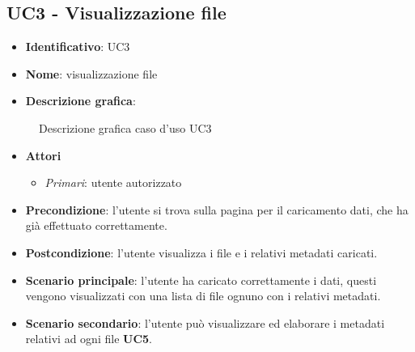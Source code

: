 
\subsection{UC3 - Visualizzazione file}
\begin{itemize}
  \item \textbf{Identificativo}: UC3
  \item \textbf{Nome}: visualizzazione file
  \item \textbf{Descrizione grafica}:
\end{itemize}

\begin{figure}[H]
  \centering
  \caption{Descrizione grafica caso d'uso UC3}
\end{figure}

\begin{itemize}
  \item \textbf{Attori}
        \begin{itemize}
          \item \textit{Primari}: utente autorizzato
        \end{itemize}
  \item \textbf{Precondizione}: l'utente si trova sulla pagina per il caricamento dati, che ha già effettuato correttamente.
  \item \textbf{Postcondizione}: l'utente visualizza i file e i relativi metadati caricati.
  \item \textbf{Scenario principale}: l'utente ha caricato correttamente i dati, questi vengono visualizzati con una lista di file ognuno con i relativi metadati.
  \item \textbf{Scenario secondario}: l'utente può visualizzare ed elaborare i metadati relativi ad ogni file \textbf{UC5}.
\end{itemize}

